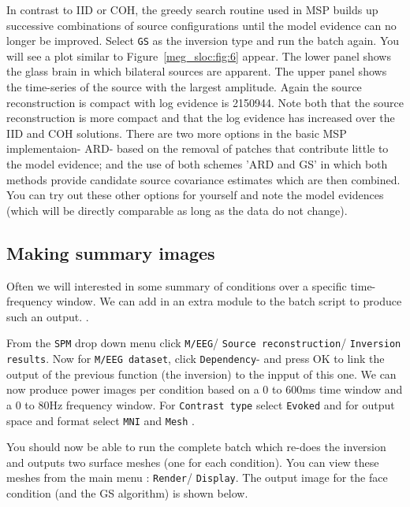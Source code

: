 In contrast to IID or COH, the greedy search routine used in MSP builds up successive combinations of source configurations until the model evidence can no longer be improved. 
Select \texttt{GS} as the inversion type and run the batch again. You will see a plot similar to Figure~\ref{meg_sloc:fig:6} appear. The lower panel shows the glass brain in which bilateral sources are apparent. The upper panel shows the time-series of the source with the largest amplitude.  Again the source reconstruction is compact with log evidence is 2150944. Note both that the source reconstruction is more compact and that the log evidence has increased over the IID and COH solutions.
There are two more options in the basic MSP implementaion- ARD- based on the removal of patches that contribute little to the model evidence; and the use of both schemes 'ARD and GS' in which both methods provide candidate source covariance estimates which are then combined.  You can try out these other options for yourself and note the model evidences (which will be directly comparable as long as the data do not change).

\subsection{Making summary images}
Often we will interested in some summary of conditions over a specific time-frequency window. We can add in an extra module to the batch script to produce such an output. .

From the \texttt{SPM} drop down menu click \texttt{M/EEG}/  \texttt{Source reconstruction}/  \texttt{Inversion results}. Now for \texttt{M/EEG dataset}, click \texttt{Dependency}- and press OK to link the output of the previous function (the inversion) to the inpput of this one. We can now produce power images per condition based on a 0 to 600ms time window and a 0 to 80Hz frequency window. For \texttt{Contrast type} select \texttt{Evoked} and for output space and format select \texttt{MNI} and  \texttt{Mesh} .

You should now be able to run the complete batch which re-does the inversion and outputs two surface meshes (one for each condition). You can view these meshes from the main menu : \texttt{Render}/ \texttt{Display}. The output image for the face condition (and the GS algorithm) is shown below. 


